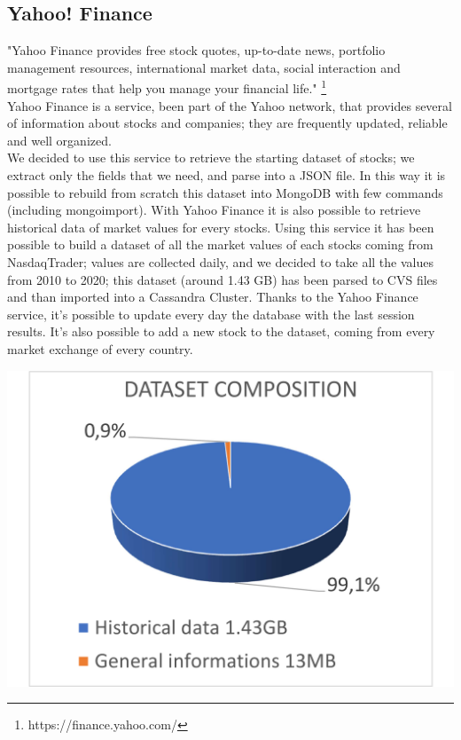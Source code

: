 \subsection{Yahoo! Finance}
"Yahoo Finance provides free stock quotes, up-to-date news, portfolio management resources, 
international market data, social interaction and mortgage rates that help you manage your 
financial life." \footnote{https://finance.yahoo.com/} \\
Yahoo Finance is a service, been part of the Yahoo network, that provides several of information
about stocks and companies; they are frequently updated, reliable and well organized.\\
We decided to use this service to retrieve the starting dataset of stocks; we extract only 
the fields that we need, and parse into a JSON file. In this way  it
is possible to rebuild from scratch this dataset into MongoDB with few commands (including
mongoimport).
With Yahoo Finance it is also possible to retrieve historical data of market values for every 
stocks. Using this service it has been possible to build a dataset of all the market values of
each stocks coming from NasdaqTrader; values are collected daily, and we decided to take all 
the values from 2010 to 2020; this dataset (around 1.43 GB) has been parsed to CVS files and
than imported into a Cassandra Cluster. Thanks to the Yahoo Finance service, it's possible
to update every day the database with the last session results. It's also possible to add a new
stock to the dataset, coming from every market exchange of every country.

\hfill \break
{\centering
\includegraphics[scale=0.12]{img/dataset_comp.png}\\
}


